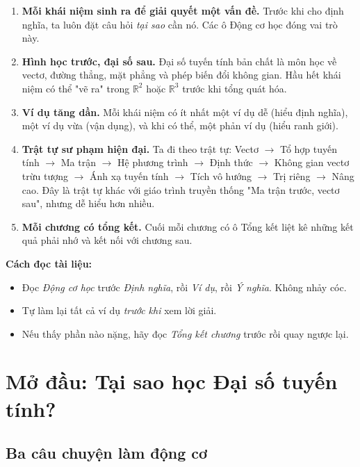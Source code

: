 \documentclass[12pt,a4paper]{article}
\begin{document}
\begin{enumerate}
  \item \textbf{Mỗi khái niệm sinh ra để giải quyết một vấn đề.} Trước khi cho định nghĩa, ta luôn đặt câu hỏi \emph{tại sao} cần nó. Các ô \textsf{\color{teal!60!black} Động cơ học} đóng vai trò này.
  \item \textbf{Hình học trước, đại số sau.} Đại số tuyến tính bản chất là môn học về vectơ, đường thẳng, mặt phẳng và phép biến đổi không gian. Hầu hết khái niệm có thể "vẽ ra" trong $\mathbb{R}^2$ hoặc $\mathbb{R}^3$ trước khi tổng quát hóa.
  \item \textbf{Ví dụ tăng dần.} Mỗi khái niệm có ít nhất một ví dụ dễ (hiểu định nghĩa), một ví dụ vừa (vận dụng), và khi có thể, một phản ví dụ (hiểu ranh giới).
  \item \textbf{Trật tự sư phạm hiện đại.} Ta đi theo trật tự: Vectơ $\to$ Tổ hợp tuyến tính $\to$ Ma trận $\to$ Hệ phương trình $\to$ Định thức $\to$ Không gian vectơ trừu tượng $\to$ Ánh xạ tuyến tính $\to$ Tích vô hướng $\to$ Trị riêng $\to$ Nâng cao. Đây là trật tự khác với giáo trình truyền thống "Ma trận trước, vectơ sau", nhưng dễ hiểu hơn nhiều.
  \item \textbf{Mỗi chương có tổng kết.} Cuối mỗi chương có ô \textsf{\color{blue!70!black} Tổng kết} liệt kê những kết quả phải nhớ và kết nối với chương sau.
\end{enumerate}

\noindent\textbf{Cách đọc tài liệu:}
\begin{itemize}
  \item Đọc \emph{Động cơ học} trước \emph{Định nghĩa}, rồi \emph{Ví dụ}, rồi \emph{Ý nghĩa}. Không nhảy cóc.
  \item Tự làm lại tất cả ví dụ \emph{trước khi} xem lời giải.
  \item Nếu thấy phần nào nặng, hãy đọc \emph{Tổng kết chương} trước rồi quay ngược lại.
\end{itemize}

\newpage

\section{Mở đầu: Tại sao học Đại số tuyến tính?}

\subsection{Ba câu chuyện làm động cơ}
\end{document}
